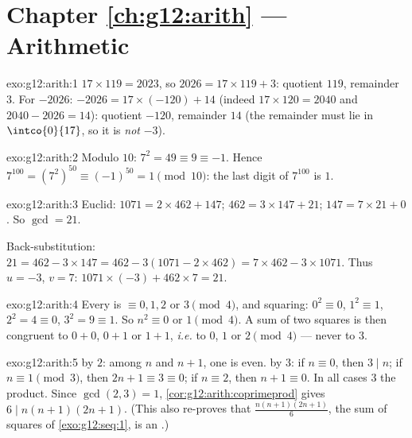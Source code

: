 \section*{Chapter \ref{ch:g12:arith} --- Arithmetic}

\begin{solution}{exo:g12:arith:1}
$17 \times 119 = 2023$, so $2026 = 17 \times 119 + 3$: quotient $119$,
remainder $3$. For $-2026$: $-2026 = 17\times(-120) + 14$ (indeed
$17 \times 120 = 2040$ and $2040 - 2026 = 14$): quotient $-120$, remainder
$14$ (the remainder must lie in $\intco{0}{17}$, so it is \emph{not} $-3$).
\end{solution}

\begin{solution}{exo:g12:arith:2}
Modulo $10$: $7^2 = 49 \equiv 9 \equiv -1$. Hence
$7^{100} = \left(7^2\right)^{50} \equiv (-1)^{50} = 1 \pmod{10}$: the last
digit of $7^{100}$ is $1$.
\end{solution}

\begin{solution}{exo:g12:arith:3}
Euclid: $1071 = 2\times462 + 147$; $462 = 3\times147 + 21$;
$147 = 7\times21 + 0$. So $\gcd = 21$.

Back-substitution: $21 = 462 - 3\times147 = 462 - 3(1071 - 2\times462)
= 7\times462 - 3\times1071$. Thus $u = -3$, $v = 7$:
$1071\times(-3) + 462\times7 = 21$.
\end{solution}

\begin{solution}{exo:g12:arith:4}
Every  is $\equiv 0, 1, 2$ or $3 \pmod 4$, and squaring:
$0^2 \equiv 0$, $1^2 \equiv 1$, $2^2 = 4 \equiv 0$, $3^2 = 9 \equiv 1$. So
$n^2 \equiv 0$ or $1 \pmod 4$. A sum of two squares is then congruent to
$0 + 0$, $0 + 1$ or $1 + 1$, \emph{i.e.} to $0$, $1$ or $2 \pmod 4$ ---
never to $3$.
\end{solution}

\begin{solution}{exo:g12:arith:5}
 by $2$: among $n$ and $n + 1$, one is even.  by
$3$: if $n \equiv 0$, then $3 \mid n$; if $n \equiv 1 \pmod 3$, then
$2n + 1 \equiv 3 \equiv 0$; if $n \equiv 2$, then $n + 1 \equiv 0$. In all
cases $3$  the product. Since $\gcd(2,3) = 1$,
\cref{cor:g12:arith:coprimeprod} gives $6 \mid n(n+1)(2n+1)$.
(This also re-proves that $\frac{n(n+1)(2n+1)}{6}$, the sum of squares of
\cref{exo:g12:seq:1}, is an .)
\end{solution}

